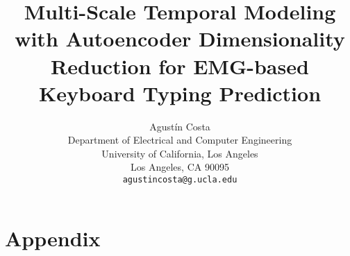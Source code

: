 \documentclass{article}
\title{Multi-Scale Temporal Modeling with Autoencoder Dimensionality Reduction for EMG-based Keyboard Typing Prediction}
\author{
  Agustín Costa\\
  Department of Electrical and Computer Engineering\\
  University of California, Los Angeles\\
  Los Angeles, CA 90095\\
  \texttt{agustincosta@g.ucla.edu}
}
\begin{document}
\maketitle













\appendix
\section*{Appendix}


\newpage

\end{document}
